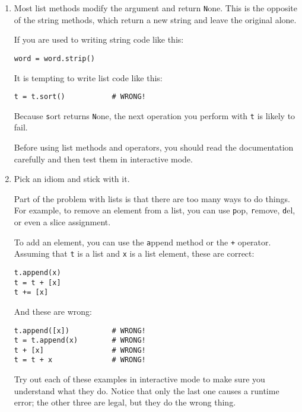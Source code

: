 \documentclass[
DIV=11,
fontsize=12,
twoside,
headinclude=false,
titlepage=firstiscover,
abstract=true,
headsepline=true,
footsepline=true,
chapterprefix=true, %
headings=big,
bibliography=totoc,%
captions=tableheading
]{scrbook}
\theoremstyle{definition}
\begin{document}
\begin{enumerate}

\item Most list methods modify the argument and
  return {\texttt None}.  This is the opposite of the string methods,
  which return a new string and leave the original alone.

If you are used to writing string code like this:

\begin{lstlisting}
word = word.strip()
\end{lstlisting}

It is tempting to write list code like this:

\begin{lstlisting}
t = t.sort()           # WRONG!
\end{lstlisting}

Because {\texttt sort} returns {\texttt None}, the
next operation you perform with {\texttt t} is likely to fail.

Before using list methods and operators, you should read the
documentation carefully and then test them in interactive mode.

\item Pick an idiom and stick with it.

Part of the problem with lists is that there are too many
ways to do things.  For example, to remove an element from
a list, you can use {\texttt pop}, {\texttt remove}, {\texttt del},
or even a slice assignment.

To add an element, you can use the {\texttt append} method or
the {\texttt +} operator.  Assuming that {\texttt t} is a list and
{\texttt x} is a list element, these are correct: 

\begin{lstlisting}
t.append(x)
t = t + [x]
t += [x]
\end{lstlisting}

And these are wrong:

\begin{lstlisting}
t.append([x])          # WRONG!
t = t.append(x)        # WRONG!
t + [x]                # WRONG!
t = t + x              # WRONG!
\end{lstlisting}

Try out each of these examples in interactive mode to make sure
you understand what they do.  Notice that only the last
one causes a runtime error; the other three are legal, but they
do the wrong thing.



\end{enumerate}
\end{document}
